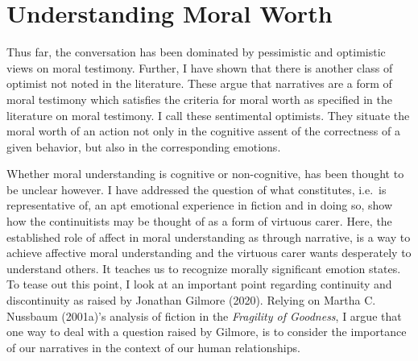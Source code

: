 \documentclass[12pt]{book}
\theoremstyle{definition}
\theoremstyle{remark}
\begin{document}
\chapter{Understanding Moral Worth}\label{understanding-moral-worth}

Thus far, the conversation has been dominated by pessimistic and optimistic views on moral testimony. Further, I have shown that there is another class of optimist not noted in the literature. These argue that narratives are a form of moral testimony which satisfies the criteria for moral worth as specified in the literature on moral testimony. I call these sentimental optimists. They situate the moral worth of an action not only in the cognitive assent of the correctness of a given behavior, but also in the corresponding emotions.

Whether moral understanding is cognitive or non-cognitive, has been thought to be unclear however. I have addressed the question of what constitutes, i.e.~is representative of, an apt emotional experience in fiction and in doing so, show how the continuitists may be thought of as a form of virtuous carer. Here, the established role of affect in moral understanding as through narrative, is a way to achieve affective moral understanding and the virtuous carer wants desperately to understand others. It teaches us to recognize morally significant emotion states. To tease out this point, I look at an important point regarding continuity and discontinuity as raised by Jonathan Gilmore (2020). Relying on Martha C. Nussbaum (2001a)'s analysis of fiction in the \emph{Fragility of Goodness}, I argue that one way to deal with a question raised by Gilmore, is to consider the importance of our narratives in the context of our human relationships.
\end{document}
